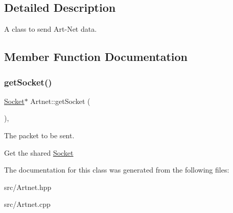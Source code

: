 \subsection{Detailed Description}
A class to send Art-\/\+Net data. 

\subsection{Member Function Documentation}
\mbox{\label{classArtnet_a2ad460313cfce83663c5493ffcebb380}} 
\subsubsection{\texorpdfstring{get\+Socket()}{getSocket()}}
{\footnotesize\ttfamily \hyperlink{classSocket}{Socket}$\ast$ Artnet\+::get\+Socket (\begin{DoxyParamCaption}{ }\end{DoxyParamCaption})\hspace{0.3cm}{\ttfamily [inline]}, {\ttfamily [private]}}



The packet to be sent. 

Get the shared \hyperlink{classSocket}{Socket} 

The documentation for this class was generated from the following files\+:\begin{DoxyCompactItemize}
\item 
src/Artnet.\+hpp\item 
src/Artnet.\+cpp\end{DoxyCompactItemize}
